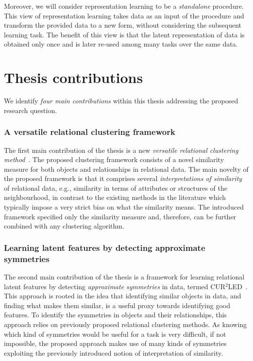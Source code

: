 Moreover, we will consider representation learning to be a \textit{standalone} procedure.
This view of representation learning takes data as an input of the procedure and transform the provided data to a new form, without considering the subsequent learning task.
The benefit of this view is that the latent representation of data is obtained only once and is later re-used among many tasks over the same data.







\section{Thesis contributions}




We identify \textit{four main contributions} within this thesis addressing the proposed research question.



\subsubsection{A versatile relational clustering framework}

The first main contribution of the thesis is a new \textit{versatile relational clustering method}~\cite{Dumancic2017a}.
The proposed clustering framework consists of a novel similarity measure for both objects and relationships in relational data.
The main novelty of the proposed framework is that it comprises several \textit{interpretations of similarity} of relational data, e.g., similarity in terms of attributes or structures of the neighbourhood, in contrast to the existing methods in the literature which typically impose a very strict bias on what the similarity means.
The introduced framework specified only the similarity measure and, therefore, can be further combined with any clustering algorithm.




\subsubsection{Learning latent features by detecting approximate symmetries}

The second main contribution of the thesis is a framework for learning relational latent features by detecting \textit{approximate symmetries} in data, termed CUR$^2$LED~\cite{Dumancic2017}.
This approach is rooted in the idea that identifying similar objects in data, and finding what makes them similar, is a useful proxy towards identifying good features.
To identify the symmetries in objects and their relationships, this approach relies on previously proposed relational clustering methods.
As knowing which kind of symmetries would be useful for a task is very difficult, if not impossible, the proposed approach makes use of many kinds of symmetries exploiting the previously introduced notion of interpretation of similarity.







